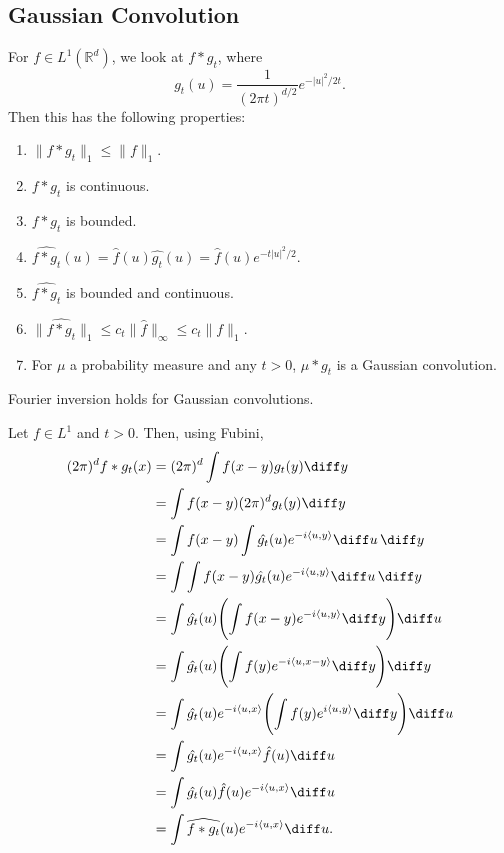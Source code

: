 \documentclass[12pt]{article}
\begin{document}

\subsection{Gaussian Convolution}
\label{sub:gauss_conv}

For $f \in L^1(\mathbb{R}^d)$, we look at $f \ast g_t$, where
\[
g_t(u) = \frac{1}{(2 \pi t)^{d/2}} e^{-|u|^2/2t}.
\]
Then this has the following properties:
\begin{enumerate}
	\item $\|f \ast g_t\|_1 \leq \|f\|_1$.
	\item $f \ast g_t$ is continuous.
	\item $f \ast g_t$ is bounded.
	\item $\widehat{f \ast g_t} (u) = \hat f(u) \hat{g_t}(u) = \hat f(u) e^{-t|u|^2/2}$.
	\item $\widehat{f \ast g_t}$ is bounded and continuous.
	\item $\|\widehat{f \ast g_t}\|_1 \leq c_t\|\hat f\|_\infty \leq c_t \|f\|_1$.
	\item For $\mu$ a probability measure and any $t > 0$, $\mu \ast g_t$ is a Gaussian convolution.
\end{enumerate}

\begin{lemma}
	Fourier inversion holds for Gaussian convolutions.
\end{lemma}

\begin{proofbox}
	Let $f \in L^1$ and $t > 0$. Then, using Fubini,
	\begin{align*}
		(2 \pi)^d f \ast g_t(x) &= (2 \pi)^d \int f(x - y) g_t(y) \diff y \\
					&= \int f(x - y) (2 \pi)^d g_t(y) \diff y \\
					&= \int f(x - y) \int \hat{g_t}(u) e^{-i \langle u, y\rangle}\diff u\, \diff y \\
					&= \int \int f(x - y) \hat{g_t}(u) e^{-i\langle u, y\rangle} \diff u \, \diff y \\
					&= \int \hat{g_t}(u) \Biggl( \int f(x - y) e^{-i \langle u, y\rangle} \diff y \Biggr) \diff u \\
					&= \int \hat{g_t}(u) \Biggl( \int f(y) e^{-i \langle u, x - y \rangle} \diff y \Biggr) \diff y \\
					&= \int \hat{g_t}(u) e^{-i\langle u, x\rangle} \Biggl( \int f(y) e^{i \langle u, y\rangle} \diff y \Biggr) \diff u \\
					&= \int \hat{g_t}(u) e^{-i \langle u, x \rangle} \hat f(u) \diff u \\
					&= \int \hat{g_t}(u) \hat f(u) e^{-i \langle u, x\rangle} \diff u \\
					&= \int \widehat{f \ast g_t}(u) e^{-i \langle u, x\rangle} \diff u.
	\end{align*}
\end{proofbox}
\end{document}
